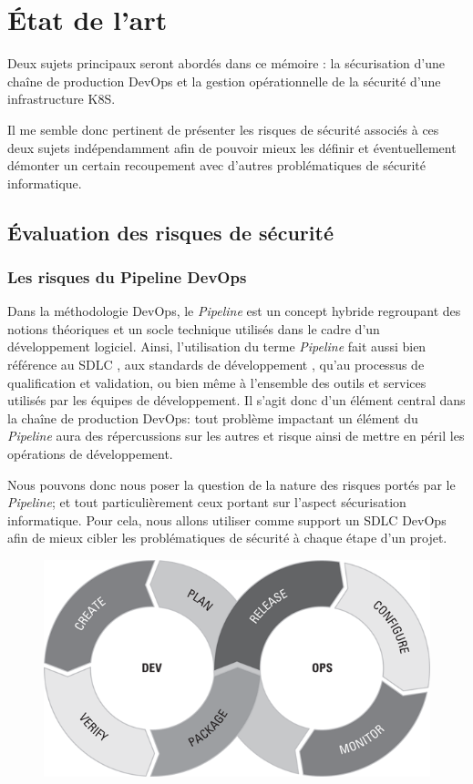 \chapter{État de l'art}
Deux sujets principaux seront abordés dans ce mémoire : la sécurisation d'une chaîne de production DevOps et la 
gestion opérationnelle de la sécurité d'une infrastructure \ac{K8S}.

Il me semble donc pertinent de présenter les risques de sécurité associés à ces deux sujets indépendamment afin de 
pouvoir mieux les définir et éventuellement démonter un certain recoupement avec d'autres problématiques de sécurité 
informatique. 


\section{Évaluation des risques de sécurité}

\subsection{Les risques du Pipeline DevOps}
Dans la méthodologie DevOps, le \emph{Pipeline} est un concept hybride regroupant des notions théoriques et un socle 
technique utilisés dans le cadre d'un développement logiciel. Ainsi, l'utilisation du terme \emph{Pipeline} fait aussi 
bien référence au \ac{SDLC} \autocite[Ch.\ 6]{devops_for_dummies_freeman_forsgren_2019}, aux standards de développement
\autocite[Ch.\ 9]{devops_for_dummies_freeman_forsgren_2019} , qu'au processus de qualification et validation, ou bien même
à l'ensemble des outils et services utilisés par les équipes de développement. 
\newline Il s'agit donc d'un élément central dans la chaîne de production DevOps: tout problème impactant un élément du 
\emph{Pipeline} aura des répercussions sur les autres et risque ainsi de mettre en péril les opérations de développement.

Nous pouvons donc nous poser la question de la nature des risques portés par le \emph{Pipeline}; et tout particulièrement
ceux portant sur l'aspect sécurisation informatique.
\newline Pour cela, nous allons utiliser comme support un \ac{SDLC} DevOps afin de mieux cibler les 
problématiques de sécurité à chaque étape d'un projet.

\vspace{0.5em}
\begin{figure}[h]
    \centering
    \includegraphics[width=0.5\linewidth]{resources/img/devops_lifecycle.png}
    \label{fig:devops-lifecycle}
\end{figure}
\newpage

